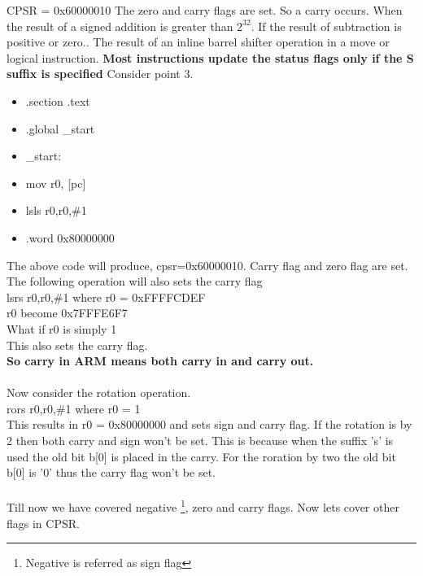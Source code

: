\documentclass{article}
\begin{document}
	CPSR = 0x60000010\newline
	The zero and carry flags are set.\newline
	So a carry occurs. When the result of a signed addition is greater than $2^{32}$. If the result of subtraction is positive or zero.. The result of an inline barrel shifter operation in a move or logical instruction.\newline
	\textbf{Most instructions update the status flags only if the S suffix is specified}\newline
	Consider point 3.\newline
	\begin{itemize}
		\item[] .section .text
		\item[] .global \_start
		\item[] \_start:
		\item[]\qquad mov r0, [pc]
		\item[]\qquad lsls r0,r0,\#1 
		\item[]\qquad .word 0x80000000
	\end{itemize}
	The above code will produce, cpsr=0x60000010.\newline
	Carry flag and zero flag are set.\newline
	The following operation will also sets the carry flag\\
	lsrs r0,r0,\#1 where r0 = 0xFFFFCDEF\\
	r0 become 0x7FFFE6F7\\
	What if r0 is simply 1\\
	This also sets the carry flag.\\
	\textbf{So carry in ARM means both carry in and carry out.}\\\\
	Now consider the rotation operation.\\
	rors r0,r0,\#1 where r0 = 1\\
	This results in r0 = 0x80000000 and sets sign and carry flag. If the rotation is by 2 then both carry and sign won't be set. This is because when the suffix 's' is used the old bit b[0] is placed in the carry. For the roration by two the old bit b[0] is '0' thus the carry flag won't be set.\\\\
	Till now we have covered negative
	\footnote{Negative is referred as sign flag}, zero and carry flags. Now lets cover other flags in CPSR.
\end{document}
